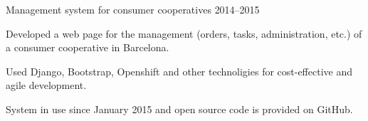 

\begin{cventries}

  \cventrynorole
    {Management system for consumer cooperatives} %
    {} %
    {2014--2015} %
    {
      \begin{cvitems} %
        \item {Developed a web page for the management (orders, tasks, administration, etc.) of a consumer cooperative in Barcelona.}
        \item {Used Django, Bootstrap, Openshift and other technoligies for cost-effective and agile development.}
        \item {System in use since January 2015 and open source code is provided on GitHub.}
      \end{cvitems}
    }

\end{cventries}
